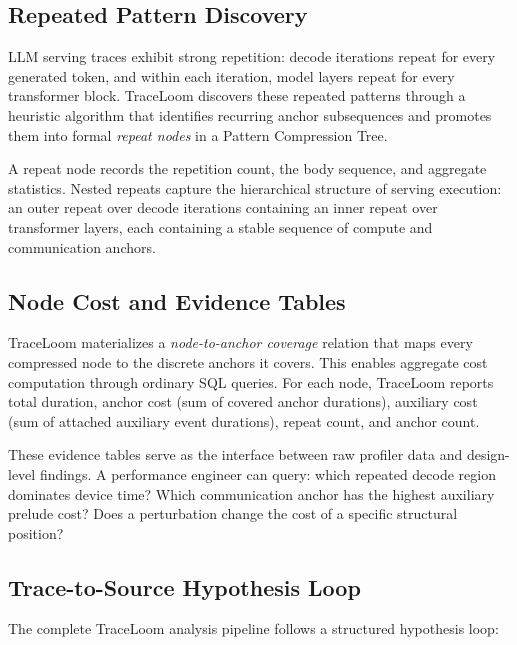 \documentclass[conference]{IEEEtran}
\begin{document}
\subsection{Repeated Pattern Discovery}

LLM serving traces exhibit strong repetition: decode iterations repeat for
every generated token, and within each iteration, model layers repeat for
every transformer block. TraceLoom discovers these repeated patterns through
a heuristic algorithm that identifies recurring anchor subsequences and
promotes them into formal \emph{repeat nodes} in a Pattern Compression Tree.

A repeat node records the repetition count, the body sequence, and aggregate
statistics. Nested repeats capture the hierarchical structure of serving
execution: an outer repeat over decode iterations containing an inner repeat
over transformer layers, each containing a stable sequence of compute and
communication anchors.

\subsection{Node Cost and Evidence Tables}

TraceLoom materializes a \emph{node-to-anchor coverage} relation that maps
every compressed node to the discrete anchors it covers. This enables
aggregate cost computation through ordinary SQL queries. For each node,
TraceLoom reports total duration, anchor cost (sum of covered anchor
durations), auxiliary cost (sum of attached auxiliary event durations), repeat
count, and anchor count.

These evidence tables serve as the interface between raw profiler data and
design-level findings. A performance engineer can query: which repeated decode
region dominates device time? Which communication anchor has the highest
auxiliary prelude cost? Does a perturbation change the cost of a specific
structural position?

\subsection{Trace-to-Source Hypothesis Loop}

The complete TraceLoom analysis pipeline follows a structured hypothesis loop:
\end{document}
